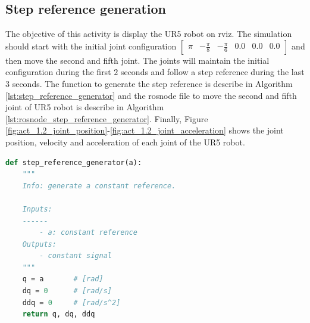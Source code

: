 \subsection{Step reference generation}
The objective of this activity is display the UR5 robot on rviz. The simulation should start with the initial joint configuration $\begin{bmatrix} \pi & -\frac{\pi}{8} & -\frac{\pi}{6} & 0.0 & 0.0 & 0.0 \end{bmatrix}$ and then move the second and fifth joint. The joints will maintain the initial configuration during the first $2$ seconds and follow a step reference during the last $3$ seconds. The function to generate the step reference is describe in Algorithm \ref{lst:step_reference_generator} and the rosnode file to move the second and fifth joint of UR5 robot is describe in Algorithm \ref{lst:rosnode_step_reference_generator}. Finally, Figure \ref{fig:act_1.2_joint_position}-\ref{fig:act_1.2_joint_acceleration} shows the joint position, velocity and acceleration of each joint of the UR5 robot.

\begin{lstlisting}[language=Python,caption=Function to generate step reference., label={lst:step_reference_generator}]
def step_reference_generator(a):
    """
    Info: generate a constant reference.

    Inputs:
    ------
        - a: constant reference
    Outputs:
        - constant signal 
    """
    q = a       # [rad]
    dq = 0      # [rad/s]
    ddq = 0     # [rad/s^2]
    return q, dq, ddq
\end{lstlisting}



